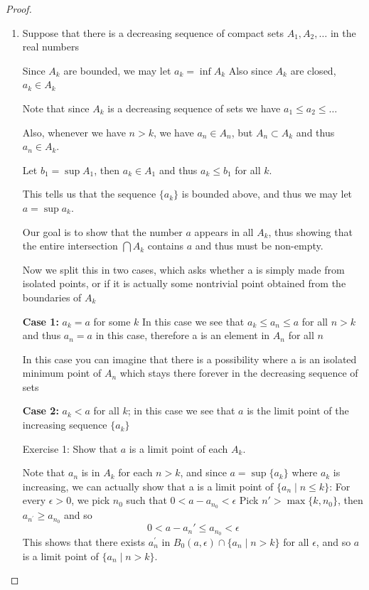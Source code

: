 \begin{proof} \
\begin{enumerate}[label=(\alph*)]
\item Suppose that there is a decreasing sequence of compact sets $A_1, A_2, \dots$ in the real numbers

Since $A_k$ are bounded, we may let $a_k=\inf A_k$
Also since $A_k$ are closed, $a_k \in A_k$

Note that since $A_k$ is a decreasing sequence of sets we have $a_1\le a_2\le\dots$

Also, whenever we have $n>k$, we have $a_n \in A_n$, but $A_n \subset A_k$ and thus $a_n \in A_k$.

Let $b_1=\sup A_1$, then $a_k \in A_1$ and thus $a_k\le b_1$ for all $k$.

This tells us that the sequence $\{a_k\}$ is bounded above, and thus we may let $a=\sup a_k$.

Our goal is to show that the number $a$ appears in all $A_k$, thus showing that the entire intersection $\bigcap A_k$ contains $a$ and thus must be non-empty.

Now we split this in two cases, which asks whether a is simply made from isolated points, or if it is actually some nontrivial point obtained from the boundaries of $A_k$

\textbf{Case 1:} $a_k=a$ for some $k$
In this case we see that $a_k\le a_n\le a$ for all $n>k$ and thus $a_n=a$ in this case, therefore a is an element in $A_n$ for all $n$

In this case you can imagine that there is a possibility where a is an isolated minimum point of $A_n$ which stays there forever in the decreasing sequence of sets

\textbf{Case 2:} $a_k<a$ for all $k$; in this case we see that $a$ is the limit point of the increasing sequence $\{a_k\}$

Exercise 1: Show that $a$ is a limit point of each $A_k$.

Note that $a_n$ is in $A_k$ for each $n>k$, and since $a=\sup\{a_k\}$ where $a_k$ is increasing, we can actually show that a is a limit point of $\{a_n \mid n \le k\}$:
For every $\epsilon>0$, we pick $n_0$ such that $0 < a-a_{n_0} < \epsilon$
Pick $n\prime > \max\{k,n_0\}$, then $a_{n^\prime} \ge a_{n_0}$ and so
\[ 0<a-a_n\prime \le a_{n_0} < \epsilon \]
This shows that there exists $a_n^\prime$ in $B_0(a,\epsilon) \cap \{a_n \mid n>k\}$ for all $\epsilon$, and so $a$ is a limit point of $\{a_n \mid n>k\}$.


\end{enumerate}
\end{proof}
